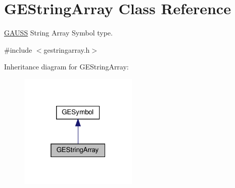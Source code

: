 \hypertarget{class_g_e_string_array}{}\section{G\+E\+String\+Array Class Reference}
\label{class_g_e_string_array}


\hyperlink{class_g_a_u_s_s}{G\+A\+U\+SS} String Array Symbol type.  




{\ttfamily \#include $<$gestringarray.\+h$>$}



Inheritance diagram for G\+E\+String\+Array\+:\nopagebreak
\begin{figure}[H]
\begin{center}
\leavevmode
\includegraphics[width=160pt]{class_g_e_string_array__inherit__graph}
\end{center}
\end{figure}
